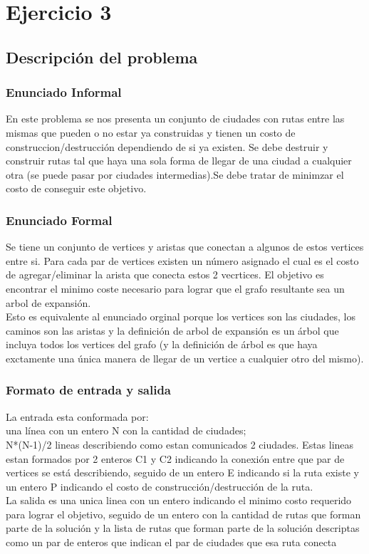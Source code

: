 \section{Ejercicio 3}

\subsection{Descripción del problema}

\subsubsection{Enunciado Informal}

En este problema se nos presenta un conjunto de ciudades con rutas entre las mismas que pueden o no estar ya construidas y tienen un costo de construccion/destrucción dependiendo de si ya existen. Se debe destruir y construir rutas tal que haya una sola forma de llegar de una ciudad a cualquier otra (se puede pasar por ciudades intermedias).Se debe tratar de minimzar el costo de conseguir este objetivo.

\subsubsection{Enunciado Formal}

Se tiene un conjunto de vertices y aristas que conectan a algunos de estos vertices entre si. Para cada par de vertices existen un número asignado el cual es el costo de agregar/eliminar la arista que conecta estos 2 vecrtices. El objetivo es encontrar el minimo coste necesario para lograr que el grafo resultante sea un arbol de expansión.\\
Esto es equivalente al enunciado orginal porque los vertices son las ciudades, los caminos son las aristas y la definición de arbol de expansión es un árbol que incluya todos los vertices del grafo (y la definición de árbol es que haya exctamente una única manera de llegar de un vertice a cualquier otro del mismo).

\subsubsection{Formato de entrada y salida}
La entrada esta conformada por:\\
una línea con un entero N con la cantidad de ciudades;\\
N*(N-1)/2 lineas describiendo como estan comunicados 2 ciudades.
Estas lineas estan formados por 2 enteros C1 y C2 indicando la conexión entre que par de vertices se está describiendo, seguido de un entero E indicando si la ruta existe y un entero P indicando el costo de construcción/destrucción de la ruta.\\
La salida es una unica linea con un entero indicando el minimo costo requerido para lograr el objetivo, seguido de un entero con la cantidad de rutas que forman parte de la solución y la lista de rutas que forman parte de la solución descriptas como un par de enteros que indican el par de ciudades que esa ruta conecta

